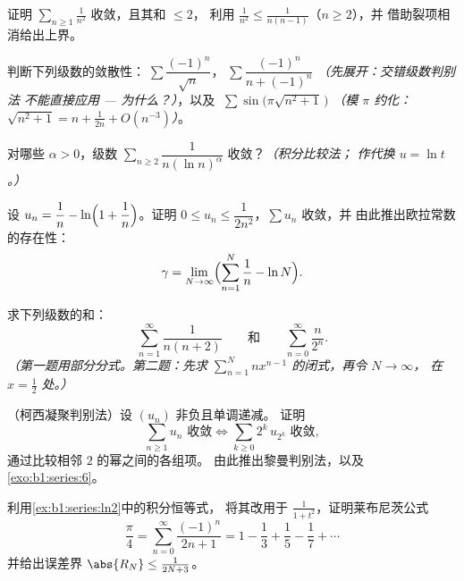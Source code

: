 \begin{exercise}[$\star$]\label{exo:b1:series:4}
证明 $\sum_{n\geq1} \frac{1}{n^2}$ 收敛，且其和 $\leq 2$，
利用 $\frac{1}{n^2} \leq \frac{1}{n(n-1)}$（$n \geq 2$），并
借助裂项相消给出上界。
\end{exercise}

\begin{exercise}[$\star\star$]\label{exo:b1:series:5}
判断下列级数的敛散性：$\;\sum \dfrac{(-1)^n}{\sqrt n}$，$\;\sum
\dfrac{(-1)^n}{n + (-1)^n}$ \emph{（先展开：交错级数判别法
不能直接应用 --- 为什么？）}，以及 $\;\sum
\sin\bigl(\pi\sqrt{n^2+1}\,\bigr)$ \emph{（模 $\pi$ 约化：
$\sqrt{n^2+1} = n + \frac{1}{2n} + O(n^{-3})$）}。
\end{exercise}

\begin{exercise}[$\star\star$]\label{exo:b1:series:6}
对哪些 $\alpha > 0$，级数 $\sum_{n \geq 2}
\dfrac{1}{n (\ln n)^{\alpha}}$ 收敛？\emph{（积分比较法；
作代换 $u = \ln t$。）}
\end{exercise}

\begin{exercise}[$\star\star$]\label{exo:b1:series:7}
设 $u_n = \dfrac{1}{n} - \ln\Bigl(1 + \dfrac1n\Bigr)$。证明
$0 \leq u_n \leq \dfrac{1}{2n^2}$，$\sum u_n$ 收敛，并
由此推出欧拉常数的存在性：
\[
\gamma = \lim_{N \to \infty} \Bigl( \sum_{n=1}^{N} \frac 1n - \ln N
\Bigr) .
\]
\end{exercise}

\begin{exercise}[$\star\star$]\label{exo:b1:series:8}
求下列级数的和：
\[
\sum_{n=1}^{\infty} \frac{1}{n(n+2)}
\qquad\text{和}\qquad
\sum_{n=0}^{\infty} \frac{n}{2^n} .
\]
\emph{（第一题用部分分式。第二题：先求
$\sum_{n=1}^{N} n x^{n-1}$ 的闭式，再令 $N \to \infty$，
在 $x = \frac12$ 处。）}
\end{exercise}

\begin{exercise}[$\star\star\star$]\label{exo:b1:series:9}
（柯西凝聚判别法）设 $(u_n)$ 非负且单调递减。
证明
\[
\sum_{n \geq 1} u_n \text{ 收敛}
\iff
\sum_{k \geq 0} 2^k\, u_{2^k} \text{ 收敛},
\]
通过比较相邻 $2$ 的幂之间的各组项。
由此推出黎曼判别法，以及
\cref{exo:b1:series:6}。
\end{exercise}

\begin{exercise}[$\star\star\star$]\label{exo:b1:series:10}
利用\cref{ex:b1:series:ln2}中的积分恒等式，
将其改用于 $\frac{1}{1+t^2}$，证明莱布尼茨公式
\[
\frac{\pi}{4} = \sum_{n=0}^{\infty} \frac{(-1)^n}{2n+1}
= 1 - \frac13 + \frac15 - \frac17 + \cdots
\]
并给出误差界 $\abs{R_N} \leq \frac{1}{2N+3}$。
\end{exercise}

